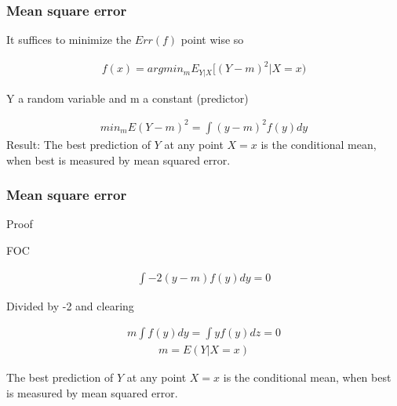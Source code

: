\documentclass[
  shownotes,
  xcolor={svgnames},
  hyperref={colorlinks,citecolor=DarkBlue,linkcolor=DarkRed,urlcolor=DarkBlue}
  ]{beamer}
\begin{document}
\begin{frame}
\frametitle{Mean square error}

It suffices to minimize  the $Err(f)$ point wise so

\begin{align}
f(x)= argmin_m E_{Y|X} [(Y-m)^2|X=x)
\end{align}

Y a random variable and m a constant (predictor)

\begin{align}
min_m E(Y-m)^2= \int (y-m)^2  f(y)dy 
\end{align}
Result: The best prediction of $Y$ at any point $X = x$ is the conditional mean, when best is measured by mean squared error. 

\end{frame}

\begin{frame}
\frametitle{Mean square error}
Proof

FOC 

\begin{align}
\int -2 (y-m)  f(y)  dy =0 
\end{align}

Divided by -2 and clearing

\begin{align}
 m \int f(y) dy = \int y f(y)  dz =0 
\end{align}
\begin{align}
m=E(Y|X=x) 
\end{align}


The best prediction of $Y$ at any point $X = x$ is the conditional mean, when best is measured by mean squared error.
\end{frame}
\end{document}
